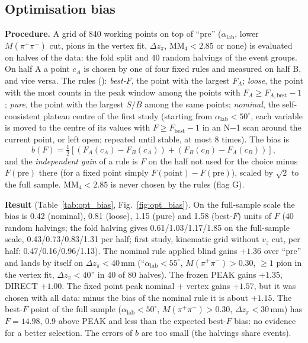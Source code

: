 \documentclass[11pt,a4paper]{article}
\newcommand{\Mpipi}{\ensuremath{M(\pi^{+}\pi^{-})}\xspace}
\newcommand{\code}[1]{\texttt{\detokenize{#1}}}
\newcommand{\MMfour}{\ensuremath{\mathrm{MM}_4}\xspace}
\newcommand{\dzpi}{\ensuremath{\Delta z_\pi}\xspace}
\newcommand{\alab}{\ensuremath{\alpha_{\mathrm{lab}}}\xspace}
\newcommand{\vz}{\ensuremath{v_z}\xspace}
\begin{document}
\subsection{Optimisation bias}
\label{sec:bias}
\textbf{Procedure.} A grid of 840 working points on top of ``pre'' (\alab, lower \Mpipi cut, pions in the vertex fit, \dzpi,
$\MMfour<2.85$ or none) is evaluated on halves of the data: the fold split and 40 random halvings of the event groups. On
half A a point $c_A$ is chosen by one of four fixed rules and measured on half B, and vice versa. The rules
(\code{opt_bias.C}): \emph{best-$F$}, the point with the largest $F_A$; \emph{loose}, the point with the most counts in the
peak window among the points with $F_A\ge F_{A,\mathrm{best}}-1$; \emph{pure}, the point with the largest $S/B$ among the same
points; \emph{nominal}, the self-consistent plateau centre of the first study (starting from $\alab<50^\circ$, each variable
is moved to the centre of its values with $F\ge F_{\mathrm{best}}-1$ in an N$-$1 scan around the current point, or left open;
repeated until stable, at most 8 times). The bias is
\begin{equation}
b(F)=\tfrac12\left[\left(F_A(c_A)-F_B(c_A)\right)+\left(F_B(c_B)-F_A(c_B)\right)\right],
\label{eq:bias}
\end{equation}
and the \emph{independent gain} of a rule is $F$ on the half not used for the choice minus $F(\mathrm{pre})$ there (for a
fixed point simply $F(\text{point})-F(\mathrm{pre})$), scaled by $\sqrt2$ to the full sample. $\MMfour<2.85$ is never chosen
by the rules (flag G).

\textbf{Result} (Table~\ref{tab:opt_bias}, Fig.~\ref{fig:opt_bias}). On the full-sample scale the bias is 0.42 (nominal), 0.81
(loose), 1.15 (pure) and 1.58 (best-$F$) units of $F$ (40 random halvings; the fold halving gives 0.61/1.03/1.17/1.85 on the
full-sample scale, 0.43/0.73/0.83/1.31 per half; first study, kinematic grid without $\vz$ cut, per half: 0.47/0.16/0.96/1.13). The nominal rule applied blind gains $+1.36$ over ``pre'' and lands by itself on
$\dzpi<40$\,mm (``$\alab<55^\circ$, $\Mpipi>0.30$, $\ge1$ pion in the vertex fit, $\dzpi<40$'' in 40 of 80 halves). The frozen PEAK
gains $+1.35$, DIRECT $+1.00$. The fixed point peak nominal + vertex gains $+1.57$, but it was chosen with all data:
minus the bias of the nominal rule it is about $+1.15$. The best-$F$ point of the full sample ($\alab<50^\circ$, $\Mpipi>0.30$,
$\dzpi<30$\,mm) has $F=14.98$, 0.9 above PEAK and less than the expected best-$F$ bias: no evidence for a better selection. The
errors of $b$ are too small (the halvings share events).
\end{document}
